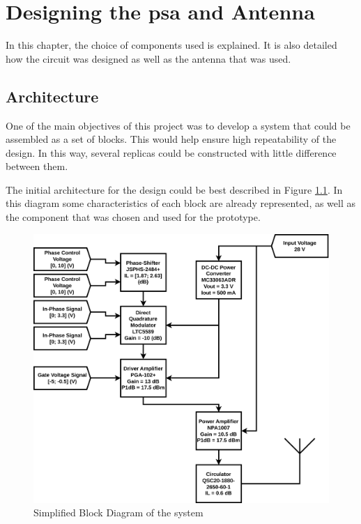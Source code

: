 \chapter{Designing the \ac{psa} and Antenna}
\label{chapter:design}

\par In this chapter, the choice of components used is explained. It is also detailed how the circuit was designed as well as the antenna that was used.

\section{Architecture}
\par One of the main objectives of this project was to develop a system that could be assembled as a set of blocks. This would help ensure high repeatability of the design. In this way, several replicas could be constructed with little difference between them.

\par The initial architecture for the design could be best described in Figure \ref{fig:ch_3_BlockDiagram.png}. In this diagram some characteristics of each block are already represented, as well as the component that was chosen and used for the prototype.

\begin{figure}[H]
    \vspace*{0cm}
    \centering
    \includegraphics[width=0.9\linewidth]{figs/ch_3_BlockDiagram.png}
    \caption{Simplified Block Diagram of the system}
    \label{fig:ch_3_BlockDiagram.png}
\end{figure}

